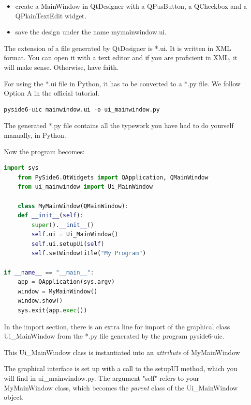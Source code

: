 \begin{itemize}
	\item create a MainWindow in QtDesigner with a QPusButton, a QCheckbox and a QPlainTextEdit widget.
	\item save the design under the name mymainwindow.ui. 
\end{itemize}
The extension of a file generated by QtDesigner is \textsf{*.ui}. It is written in XML format. You can open it with a text editor and if you are proficient in XML, it will make sense. Otherwise, have faith.

For using the *.ui file in Python, it has to be converted to a *.py file. We follow Option A in the official tutorial.

\begin{lstlisting}[style=DOS]
	pyside6-uic mainwindow.ui -o ui_mainwindow.py
\end{lstlisting}

The generated *.py file contains all the typework you have had to do yourself manually, in Python.

Now the program becomes:
\begin{lstlisting}[language=Python, numbers=none, aboveskip=\smallskipamount]
    import sys
    from PySide6.QtWidgets import QApplication, QMainWindow
    from ui_mainwindow import Ui_MainWindow

    class MyMainWindow(QMainWindow):
    def __init__(self):
        super().__init__()
        self.ui = Ui_MainWindow()
        self.ui.setupUi(self)
        self.setWindowTitle("My Program")

if __name__ == "__main__":
    app = QApplication(sys.argv)
    window = MyMainWindow()
    window.show()
    sys.exit(app.exec())
\end{lstlisting}

In the \textsf{import} section, there is an extra line for import of the graphical class \textsf{Ui\_MainWindow} from the *.py file generated by the program \textsf{pyside6-uic}.

This \textsf{Ui\_MainWindow} class is instantiated into an \emph{attribute} of \textsf{MyMainWindow}

The graphical interface is set up with a call to the \textsf{setupUI} method, which you will find in \textsf{ui\_mainwindow.py}. The argument "self" refers to your MyMainWindow class, which becomes the \emph{parent} class of the \textsf{Ui\_MainWindow} object.

\newpage
